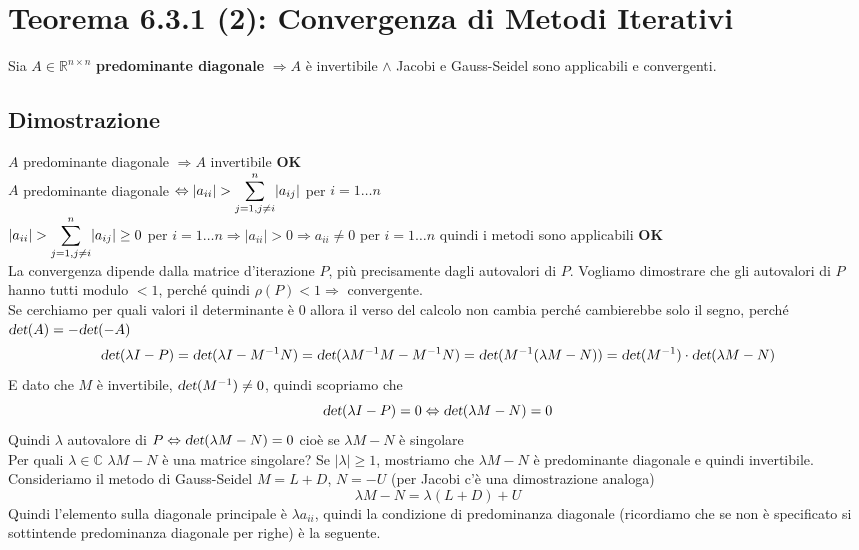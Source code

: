 \documentclass[10pt]{book}
\begin{document}
\section{Teorema 6.3.1 (2): Convergenza di Metodi Iterativi} Sia $A \in \mathbb{R}^{n \times n}$ \textbf{predominante diagonale} $\Rightarrow A$ è invertibile $\wedge$ Jacobi e Gauss-Seidel sono applicabili e convergenti.
\subsection{Dimostrazione} $A$ predominante diagonale $\Rightarrow A$ invertibile \textbf{OK}\\
$A$ predominante diagonale $\Leftrightarrow |a_{ii}| > \mathlarger{\sum_{j=1, j\neq i}^n} |a_{ij}|$ per $i=1\ldots n$\\
$|a_{ii}| > \mathlarger{\sum_{j=1, j\neq i}^n} |a_{ij}| \geq 0$ per $i=1\ldots n \Rightarrow |a_{ii}| > 0 \Rightarrow a_{ii} \neq 0$ per $i=1\ldots n$ quindi i metodi sono applicabili \textbf{OK}\\
La convergenza dipende dalla matrice d'iterazione $P$, più precisamente dagli autovalori di $P$. Vogliamo dimostrare che gli autovalori di $P$ hanno tutti modulo $< 1$, perché quindi $\rho(P) < 1 \Rightarrow$ convergente.\\
Se cerchiamo per quali valori il determinante è 0 allora il verso del calcolo non cambia perché cambierebbe solo il segno, perché $\textsl{det}(A) = -\textsl{det}(-A)$
$$\textsl{det}(\lambda I - P) = \textsl{det}(\lambda I - M^{-1}N) = \textsl{det}(\lambda M^{-1}M - M^{-1}N) = \textsl{det}( M^{-1}(\lambda M - N)) = \textsl{det}(M^{-1})\cdot\textsl{det}(\lambda M - N)$$
E dato che $M$ è invertibile, $\textsl{det}(M^{-1})\neq 0$, quindi scopriamo che
$$\textsl{det}(\lambda I - P) = 0 \Leftrightarrow \textsl{det}(\lambda M - N) = 0$$
Quindi $\lambda$ autovalore di $P \Leftrightarrow \textsl{det}(\lambda M - N) = 0$ cioè se $\lambda M - N$ è singolare\\
Per quali $\lambda \in \mathbb{C}$ $\lambda M - N$ è una matrice singolare? Se $|\lambda|\geq 1$, mostriamo che $\lambda M - N$ è predominante diagonale e quindi invertibile.\\
Consideriamo il metodo di Gauss-Seidel $M = L + D$, $N = - U$ (per Jacobi c'è una dimostrazione analoga)
$$\lambda M - N = \lambda(L+D)+U$$
Quindi l'elemento sulla diagonale principale è $\lambda a_{ii}$, quindi la condizione di predominanza diagonale (ricordiamo che se non è specificato si sottintende predominanza diagonale per righe) è la seguente.
\end{document}
